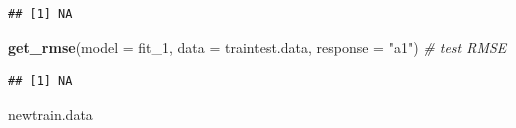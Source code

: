 \documentclass[]{report}
\newenvironment{Shaded}{\begin{snugshade}}{\end{snugshade}}
\newcommand{\KeywordTok}[1]{\textcolor[rgb]{0.13,0.29,0.53}{\textbf{#1}}}
\newcommand{\DataTypeTok}[1]{\textcolor[rgb]{0.13,0.29,0.53}{#1}}
\newcommand{\DecValTok}[1]{\textcolor[rgb]{0.00,0.00,0.81}{#1}}
\newcommand{\StringTok}[1]{\textcolor[rgb]{0.31,0.60,0.02}{#1}}
\newcommand{\CommentTok}[1]{\textcolor[rgb]{0.56,0.35,0.01}{\textit{#1}}}
\newcommand{\NormalTok}[1]{#1}
\begin{document}
\begin{verbatim}
## [1] NA
\end{verbatim}

\begin{Shaded}
\begin{Highlighting}[]
\KeywordTok{get_rmse}\NormalTok{(}\DataTypeTok{model =}\NormalTok{ fit_}\DecValTok{1}\NormalTok{, }\DataTypeTok{data =}\NormalTok{ traintest.data, }\DataTypeTok{response =} \StringTok{"a1"}\NormalTok{) }\CommentTok{# test RMSE}
\end{Highlighting}
\end{Shaded}

\begin{verbatim}
## [1] NA
\end{verbatim}

\begin{Shaded}
\begin{Highlighting}[]
\NormalTok{newtrain.data}
\end{Highlighting}
\end{Shaded}
\end{document}
